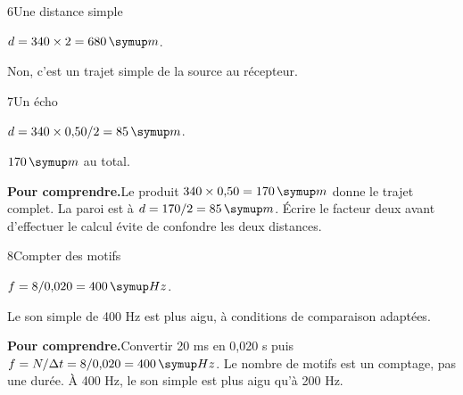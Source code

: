 \par\noindent\begin{minipage}{\linewidth}
\begin{corrige}{6}{Une distance simple}
\begin{questions}
\item $d=340\times2=680\unite m$.
\item Non, c’est un trajet simple de la source au récepteur.
\end{questions}
\end{corrige}
\end{minipage}
\par\noindent\begin{minipage}{\linewidth}
\begin{corrige}{7}{Un écho}
\begin{questions}
\item $d=340\times0{,}50/2=85\unite m$.
\item $170\unite m$ au total.
\end{questions}
\par\smallskip\noindent\textbf{Pour comprendre.}\enspace Le produit $340\times0{,}50=170\unite m$ donne le trajet complet. La paroi est à $d=170/2=85\unite m$. Écrire le facteur deux avant d’effectuer le calcul évite de confondre les deux distances.\par
{}
\end{corrige}
\end{minipage}
\par\noindent\begin{minipage}{\linewidth}
\begin{corrige}{8}{Compter des motifs}
\begin{questions}
\item $f=8/0{,}020=400\unite{Hz}$.
\item Le son simple de 400 Hz est plus aigu, à conditions de comparaison adaptées.
\end{questions}
\par\smallskip\noindent\textbf{Pour comprendre.}\enspace Convertir 20 ms en 0,020 s puis $f=N/\Delta t=8/0{,}020=400\unite{Hz}$. Le nombre de motifs est un comptage, pas une durée. À 400 Hz, le son simple est plus aigu qu’à 200 Hz.\par
{}
\end{corrige}
\end{minipage}

